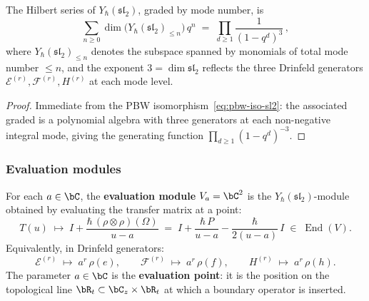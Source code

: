 \begin{corollary}
\label{cor:hilbert-sl2}
The Hilbert series of $Y_\hbar(\mathfrak{sl}_2)$, graded by mode
number, is
\begin{equation}\label{eq:hilbert-sl2}
\sum_{n\ge 0}\dim\bigl(Y_\hbar(\mathfrak{sl}_2)_{\le n}\bigr)\,q^n
\;=\;
\prod_{d\ge 1}\frac{1}{(1-q^d)^3}\,,
\end{equation}
where $Y_\hbar(\mathfrak{sl}_2)_{\le n}$ denotes the subspace spanned
by monomials of total mode number $\le n$, and the exponent
$3=\dim\mathfrak{sl}_2$ reflects the three Drinfeld generators
$\mathcal{E}^{(r)},\mathcal{F}^{(r)},H^{(r)}$ at each mode level.
\end{corollary}

\begin{proof}
Immediate from the PBW isomorphism~\eqref{eq:pbw-iso-sl2}: the
associated graded is a polynomial algebra with three generators at
each non-negative integral mode, giving the generating function
$\prod_{d\ge 1}(1-q^d)^{-3}$.
\end{proof}

\subsubsection*{Evaluation modules}

\begin{construction}
\label{constr:eval-sl2}
For each $a\in\bC$, the \textbf{evaluation module}
$V_a=\bC^2$ is the $Y_\hbar(\mathfrak{sl}_2)$-module obtained
by evaluating the transfer matrix at a point:
\begin{equation}\label{eq:eval-module-sl2}
T(u)\;\mapsto\;I+\frac{\hbar\,(\rho\otimes\rho)(\Omega)}{u-a}
\;=\;I+\frac{\hbar\,P}{u-a}-\frac{\hbar}{2(u-a)}\,I
\;\in\;\operatorname{End}(V).
\end{equation}
Equivalently, in Drinfeld generators:
\begin{equation}\label{eq:eval-drinfeld-sl2}
\mathcal{E}^{(r)}\;\mapsto\;a^r\,\rho(e),\qquad
\mathcal{F}^{(r)}\;\mapsto\;a^r\,\rho(f),\qquad
H^{(r)}\;\mapsto\;a^r\,\rho(h).
\end{equation}
The parameter $a\in\bC$ is the \textbf{evaluation point}: it
is the position on the topological line $\bR_t\subset\bC_z\times\bR_t$
at which a boundary operator is inserted.
\end{construction}

